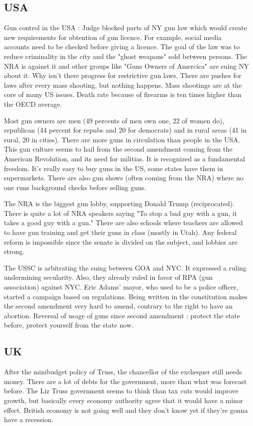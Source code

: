 \documentclass[a4paper,12pt]{book}
\begin{document}
\subsection{USA}
Gun control in the USA : Judge blocked parts of NY gun law which would create new requirements for obtention of gun licence. For example, social media accounts need to be checked before giving a licence. The goal of the law was to reduce criminality in the city and the "ghost weapons" sold between persons. The NRA is against it and other groups like "Guns Owners of Amercica" are suing NY about it. Why isn't there progress for restrictive gun laws. There are pushes for laws after every mass shooting, but nothing happens. Mass shootings are at the core of many US issues. Death rate because of firearms is ten times higher than the OECD average.
\par Most gun owners are men (49 percents of men own one, 22 of women do), republican (44 percent for repubs and 20 for democrats) and in rural areas (41 in rural, 20 in cities). There are more guns in circulation than people in the USA. This gun culture seems to hail from the second amendment coming from the American Revolution, and its need for militias. It is recognized as a fundamental freedom. It's really easy to buy guns in the US, some states have them in supermarkets. There are also gun shows (often coming from the NRA) where no one runs background checks before selling guns.
\par The NRA is the biggest gun lobby, supporting Donald Trump (reciprocated). There is quite a lot of NRA speakers saying "To stop a bad guy with a gun, it takes a good guy with a gun." There are also schools where teachers are allowed to have gun training and get their guns in class (mostly in Utah). Any federal reform is impossible since the senate is divided on the subject, and lobbies are strong.
\par The USSC is arbitrating the suing between GOA and NYC. It expressed a ruling undermining secularity. Also, they already ruled in favor of RPA (gun association) against NYC. Eric Adams' mayor, who used to be a police officer, started a campaign based on regulations. Being written in the constitution makes the second amendment very hard to amend, contrary to the right to have an abortion. Reversal of usage of guns since second amendment : protect the state before, protect yourself from the state now.

\subsection{UK}
After the minibudget policy of Truss, the chancellor of the exchequer still needs money. There are a lot of debts for the government, more than what was forecast before. The Liz Truss government seems to think than tax cuts would improve growth, but basically every economy authority agree that it would have a minor effect. British economy is not going well and they don't know yet if they're gonna have a recession.
\end{document}
